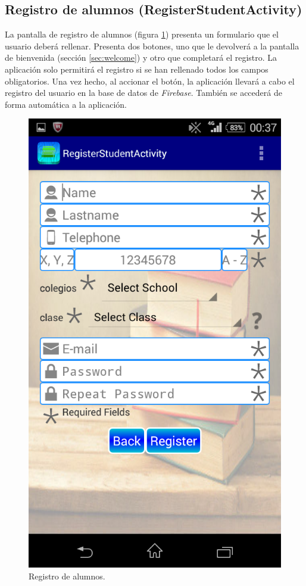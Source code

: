 		
		\subsection{Registro de alumnos (RegisterStudentActivity)} \label{sec:StudentRegister}
			
			La pantalla de registro de alumnos (figura \ref{fig:StudentRegister}) presenta un formulario que el usuario deberá rellenar. Presenta dos botones, uno que le devolverá a la pantalla de bienvenida (sección \ref{sec:welcome}) y otro que completará el registro. La aplicación solo permitirá el registro si se han rellenado todos los campos obligatorios. Una vez hecho, al accionar el botón, la aplicación llevará a cabo el registro del usuario en la base de datos de {\it Firebase}. También se accederá de forma automática a la aplicación.
			
			\begin{figure}[h !]
				\centering
				\includegraphics[scale=0.2]{Imagenes/App/registroAlumno}
				\caption{Registro de alumnos.}
				\label{fig:StudentRegister}
			\end{figure}
			
